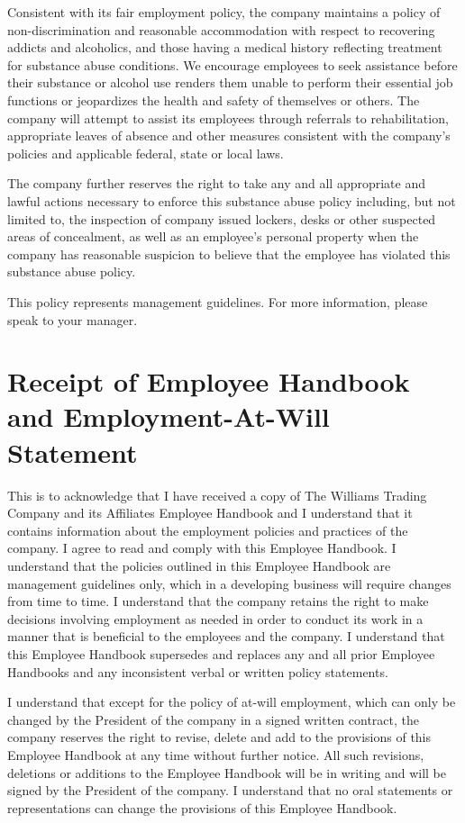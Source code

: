 \documentclass{book}
\begin{document}
Consistent with its fair employment policy, the company maintains a policy of non-discrimination and reasonable accommodation with respect to recovering addicts and alcoholics, and those having a medical history reflecting treatment for substance abuse conditions. We encourage employees to seek assistance before their substance or alcohol use renders them unable to perform their essential job functions or jeopardizes the health and safety of themselves or others. The company will attempt to assist its employees through referrals to rehabilitation, appropriate leaves of absence and other measures consistent with the company's policies and applicable federal, state or local laws.

The company further reserves the right to take any and all appropriate and lawful actions necessary to enforce this substance abuse policy including, but not limited to, the inspection of company issued lockers, desks or other suspected areas of concealment, as well as an employee's personal property when the company has reasonable suspicion to believe that the employee has violated this substance abuse policy.

This policy represents management guidelines. For more information, please speak to your manager.

\newpage

\section{Receipt of Employee Handbook and Employment-At-Will Statement}

This is to acknowledge that I have received a copy of The Williams Trading Company and its Affiliates Employee Handbook and I understand that it contains information about the employment policies and practices of the company. I agree to read and comply with this Employee Handbook. I understand that the policies outlined in this Employee Handbook are management guidelines only, which in a developing business will require changes from time to time. I understand that the company retains the right to make decisions involving employment as needed in order to conduct its work in a  manner that is beneficial to the employees and the company. I understand that this Employee Handbook supersedes and replaces any and all prior Employee Handbooks and any inconsistent verbal or written policy statements.

I understand that except for the policy of at-will employment, which can only be changed by the President of the company in a signed written contract, the company reserves the right to revise, delete and add to the provisions of this Employee Handbook at any time without further notice. All such revisions, deletions or additions to the Employee Handbook will be in writing and will be signed by the President of the company. I understand that no oral statements or representations can change the provisions of this Employee Handbook. 
\end{document}
